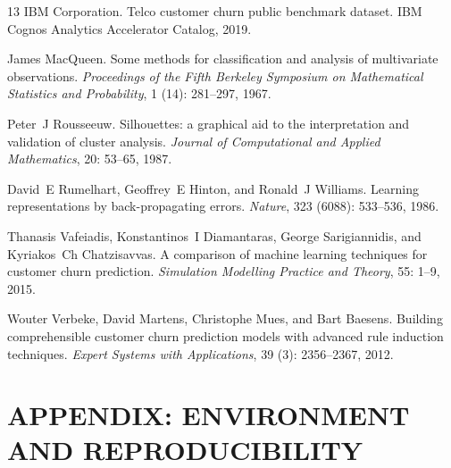 \documentclass[12pt,a4paper]{report}
\begin{document}
\begin{thebibliography}{13}
{IBM Corporation}.
\newblock Telco customer churn public benchmark dataset.
\newblock IBM Cognos Analytics Accelerator Catalog, 2019.

James MacQueen.
\newblock Some methods for classification and analysis of multivariate
  observations.
\newblock \emph{Proceedings of the Fifth Berkeley Symposium on Mathematical
  Statistics and Probability}, 1 (14): 281--297, 1967.

Peter~J Rousseeuw.
\newblock Silhouettes: a graphical aid to the interpretation and validation of
  cluster analysis.
\newblock \emph{Journal of Computational and Applied Mathematics}, 20:
  53--65, 1987.

David~E Rumelhart, Geoffrey~E Hinton, and Ronald~J Williams.
\newblock Learning representations by back-propagating errors.
\newblock \emph{Nature}, 323 (6088): 533--536, 1986.

Thanasis Vafeiadis, Konstantinos~I Diamantaras, George Sarigiannidis, and
  Kyriakos~Ch Chatzisavvas.
\newblock A comparison of machine learning techniques for customer churn
  prediction.
\newblock \emph{Simulation Modelling Practice and Theory}, 55: 1--9,
  2015.

Wouter Verbeke, David Martens, Christophe Mues, and Bart Baesens.
\newblock Building comprehensible customer churn prediction models with
  advanced rule induction techniques.
\newblock \emph{Expert Systems with Applications}, 39 (3):
  2356--2367, 2012.

\end{thebibliography}

\newpage
\chapter*{APPENDIX: ENVIRONMENT AND REPRODUCIBILITY}
\end{document}
